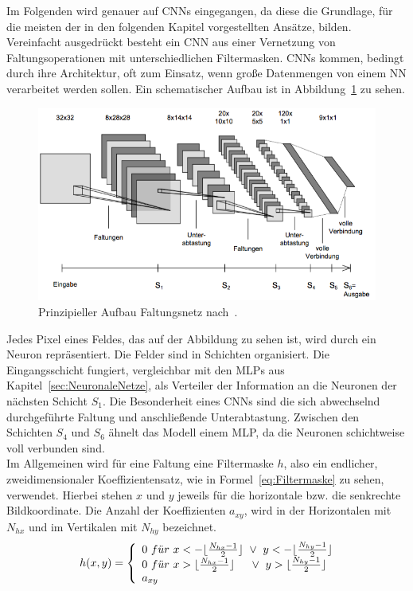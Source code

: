 \documentclass[times, 11pt,twocolumn]{article}
\begin{document}
 \label{sec:Faltungsnetze}
Im Folgenden wird genauer auf CNNs eingegangen, da diese die Grundlage, für die meisten der in den folgenden Kapitel vorgestellten Ansätze, bilden. Vereinfacht ausgedrückt besteht ein CNN aus einer Vernetzung von Faltungsoperationen mit unterschiedlichen Filtermasken. CNNs kommen, bedingt durch ihre Architektur, oft zum Einsatz, wenn große Datenmengen von einem NN verarbeitet werden sollen. Ein schematischer Aufbau ist in Abbildung~\ref{fig:CNN} zu sehen. \\
\begin{figure}
	\flushleft
	\includegraphics[width=\columnwidth]{Bilder/structure-cnn.jpg}
	\caption{Prinzipieller Aufbau Faltungsnetz nach~\cite{Osadchy}.}
	\label{fig:CNN}
\end{figure}
Jedes Pixel eines Feldes, das auf der Abbildung zu sehen ist, wird durch ein Neuron repräsentiert. Die Felder sind in Schichten organisiert. Die Eingangsschicht fungiert, vergleichbar mit den MLPs aus Kapitel~\ref{sec:NeuronaleNetze}, als Verteiler der Information an die Neuronen der nächsten Schicht $S_1$. Die Besonderheit eines CNNs sind die sich abwechselnd durchgeführte Faltung und anschließende Unterabtastung. Zwischen den Schichten $S_4$ und $S_6$ ähnelt das Modell einem MLP, da die Neuronen schichtweise voll verbunden sind.\\
Im Allgemeinen wird für eine Faltung eine Filtermaske $h$, also ein endlicher, zweidimensionaler Koeffizientensatz, wie in Formel~\ref{eq:Filtermaske} zu sehen, verwendet. Hierbei stehen $x$ und $y$ jeweils für die horizontale bzw. die senkrechte Bildkoordinate. Die Anzahl der Koeffizienten $a_{xy}$, wird in der Horizontalen mit $N_{hx}$ und im Vertikalen mit $N_{hy}$ bezeichnet. 
\footnotesize
\begin{equation} 
	h(x,y) = \left\lbrace
  \begin{array}{l@{}l}
   0~f\ddot{u}r~x<-\lfloor\frac{N_{hx}-1}{2}\rfloor~\vee~y<-\lfloor\frac{N_{hy}-1}{2}\rfloor\\
    0~f\ddot{u}r~x>\lfloor\frac{N_{hx}-1}{2}\rfloor~~~~\vee~y>\lfloor\frac{N_{hy}-1}{2}\rfloor \\
    a_{xy}
  \end{array}
  \right.	
	\label{eq:Filtermaske}
\end{equation}
\end{document}

